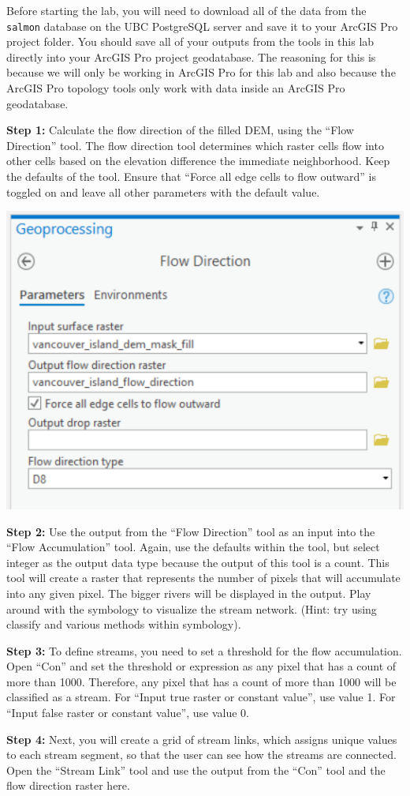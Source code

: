\documentclass[
]{book}
\begin{document}
Before starting the lab, you will need to download all of the data from the \texttt{salmon} database on the UBC PostgreSQL server and save it to your ArcGIS Pro project folder. You should save all of your outputs from the tools in this lab directly into your ArcGIS Pro project geodatabase. The reasoning for this is because we will only be working in ArcGIS Pro for this lab and also because the ArcGIS Pro topology tools only work with data inside an ArcGIS Pro geodatabase.

\textbf{Step 1:} Calculate the flow direction of the filled DEM, using the ``Flow Direction'' tool. The flow direction tool determines which raster cells flow into other cells based on the elevation difference the immediate neighborhood. Keep the defaults of the tool. Ensure that ``Force all edge cells to flow outward'' is toggled on and leave all other parameters with the default value.

\includegraphics[width=0.5\linewidth]{images/02-flow-direction}

\textbf{Step 2:} Use the output from the ``Flow Direction'' tool as an input into the ``Flow Accumulation'' tool. Again, use the defaults within the tool, but select integer as the output data type because the output of this tool is a count. This tool will create a raster that represents the number of pixels that will accumulate into any given pixel. The bigger rivers will be displayed in the output. Play around with the symbology to visualize the stream network. (Hint: try using classify and various methods within symbology).

\textbf{Step 3:} To define streams, you need to set a threshold for the flow accumulation. Open ``Con'' and set the threshold or expression as any pixel that has a count of more than 1000. Therefore, any pixel that has a count of more than 1000 will be classified as a stream. For ``Input true raster or constant value'', use value 1. For ``Input false raster or constant value'', use value 0.

\textbf{Step 4:} Next, you will create a grid of stream links, which assigns unique values to each stream segment, so that the user can see how the streams are connected. Open the ``Stream Link'' tool and use the output from the ``Con'' tool and the flow direction raster here.
\end{document}
